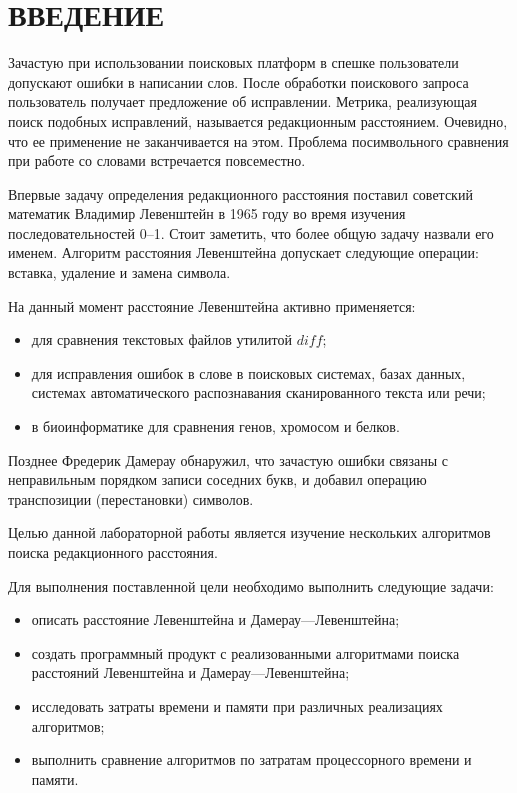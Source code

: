 \chapter*{ВВЕДЕНИЕ}

Зачастую при использовании поисковых платформ в спешке пользователи допускают ошибки в написании слов.
После обработки поискового запроса пользователь получает предложение об исправлении.
Метрика, реализующая поиск подобных исправлений, называется редакционным расстоянием.
Очевидно, что ее применение не заканчивается на этом.
Проблема посимвольного сравнения при работе со словами встречается повсеместно.

Впервые задачу определения редакционного расстояния поставил советский математик Владимир Левенштейн в 1965 году во время изучения последовательностей 0--1. 
Стоит заметить, что более общую задачу назвали его именем. 
Алгоритм расстояния Левенштейна допускает следующие операции: вставка, удаление и замена символа.

На данный момент расстояние Левенштейна активно применяется:
\begin{itemize}
	\item для сравнения текстовых файлов утилитой ${diff}$;
	\item для исправления ошибок в слове в поисковых системах, базах данных, системах автоматического распознавания сканированного текста или речи;
	\item в биоинформатике для сравнения генов, хромосом и белков.
\end{itemize}

Позднее Фредерик Дамерау обнаружил, что зачастую ошибки связаны с неправильным порядком записи соседних букв, и добавил операцию транспозиции (перестановки) символов.

Целью данной лабораторной работы является изучение нескольких алгоритмов поиска редакционного расстояния.

Для выполнения поставленной цели необходимо выполнить следующие задачи:
\begin{itemize}
	\item описать расстояние Левенштейна и Дамерау---Левенштейна;
	\item создать программный продукт с реализованными алгоритмами поиска расстояний Левенштейна и Дамерау---Левенштейна;
	\item исследовать затраты времени и памяти при различных реализациях алгоритмов;
	\item выполнить сравнение алгоритмов по затратам процессорного времени и памяти.
\end{itemize}

